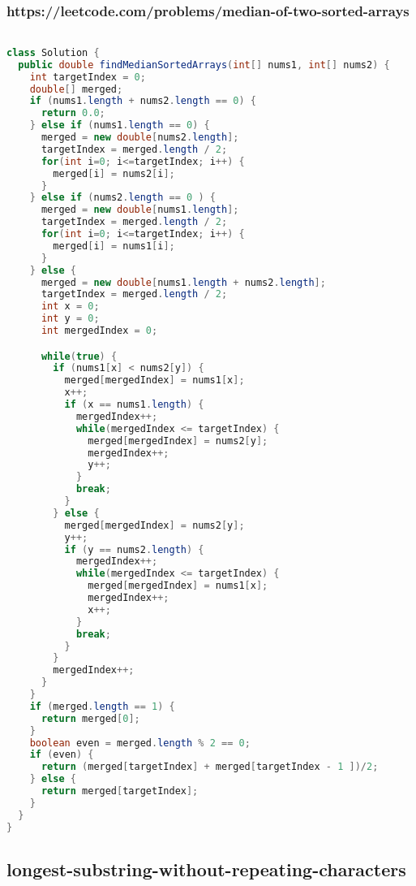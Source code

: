 \documentclass[12pt]{article}
\begin{document}
\subsubsection{https://leetcode.com/problems/median-of-two-sorted-arrays}
\begin{lstlisting}[language=Java]

class Solution {
  public double findMedianSortedArrays(int[] nums1, int[] nums2) {
    int targetIndex = 0;
    double[] merged;
    if (nums1.length + nums2.length == 0) {
      return 0.0;
    } else if (nums1.length == 0) {
      merged = new double[nums2.length];
      targetIndex = merged.length / 2;
      for(int i=0; i<=targetIndex; i++) {
        merged[i] = nums2[i];
      }
    } else if (nums2.length == 0 ) {
      merged = new double[nums1.length];
      targetIndex = merged.length / 2;
      for(int i=0; i<=targetIndex; i++) {
        merged[i] = nums1[i];
      }
    } else {
      merged = new double[nums1.length + nums2.length];
      targetIndex = merged.length / 2;
      int x = 0;
      int y = 0;
      int mergedIndex = 0;

      while(true) {
        if (nums1[x] < nums2[y]) {
          merged[mergedIndex] = nums1[x];
          x++;
          if (x == nums1.length) {
            mergedIndex++;
            while(mergedIndex <= targetIndex) {
              merged[mergedIndex] = nums2[y];
              mergedIndex++;
              y++;
            }
            break;
          }
        } else {
          merged[mergedIndex] = nums2[y];
          y++;
          if (y == nums2.length) {
            mergedIndex++;
            while(mergedIndex <= targetIndex) {
              merged[mergedIndex] = nums1[x];
              mergedIndex++;
              x++;
            }
            break;
          }
        }
        mergedIndex++;
      }
    }
    if (merged.length == 1) {
      return merged[0];
    }
    boolean even = merged.length % 2 == 0;
    if (even) {
      return (merged[targetIndex] + merged[targetIndex - 1 ])/2;
    } else {
      return merged[targetIndex];
    }
  }
}
\end{lstlisting}
\subsection{longest-substring-without-repeating-characters} 
\end{document}
